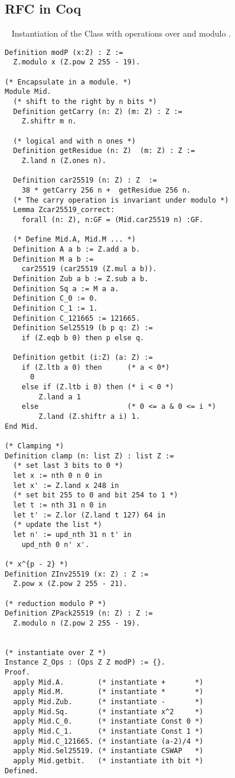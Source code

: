 \subsection{RFC in Coq}
\label{subsubsec:RFC-Coq}
~
Instantiation of the Class  with operations over \Z and modulo \p.
\begin{lstlisting}[language=Coq]
Definition modP (x:Z) : Z :=
  Z.modulo x (Z.pow 2 255 - 19).

(* Encapsulate in a module. *)
Module Mid.
  (* shift to the right by n bits *)
  Definition getCarry (n: Z) (m: Z) : Z :=
    Z.shiftr m n.

  (* logical and with n ones *)
  Definition getResidue (n: Z)  (m: Z) : Z :=
    Z.land n (Z.ones n).

  Definition car25519 (n: Z) : Z  :=
    38 * getCarry 256 n +  getResidue 256 n.
  (* The carry operation is invariant under modulo *)
  Lemma Zcar25519_correct:
    forall (n: Z), n:GF = (Mid.car25519 n) :GF.

  (* Define Mid.A, Mid.M ... *)
  Definition A a b := Z.add a b.
  Definition M a b :=
    car25519 (car25519 (Z.mul a b)).
  Definition Zub a b := Z.sub a b.
  Definition Sq a := M a a.
  Definition C_0 := 0.
  Definition C_1 := 1.
  Definition C_121665 := 121665.
  Definition Sel25519 (b p q: Z) :=
    if (Z.eqb b 0) then p else q.

  Definition getbit (i:Z) (a: Z) :=
    if (Z.ltb a 0) then      (* a < 0*)
      0
    else if (Z.ltb i 0) then (* i < 0 *)
        Z.land a 1
    else                     (* 0 <= a & 0 <= i *)
        Z.land (Z.shiftr a i) 1.
End Mid.

(* Clamping *)
Definition clamp (n: list Z) : list Z :=
  (* set last 3 bits to 0 *)
  let x := nth 0 n 0 in
  let x' := Z.land x 248 in
  (* set bit 255 to 0 and bit 254 to 1 *)
  let t := nth 31 n 0 in
  let t' := Z.lor (Z.land t 127) 64 in
  (* update the list *)
  let n' := upd_nth 31 n t' in
    upd_nth 0 n' x'.

(* x^{p - 2} *)
Definition ZInv25519 (x: Z) : Z :=
  Z.pow x (Z.pow 2 255 - 21).

(* reduction modulo P *)
Definition ZPack25519 (n: Z) : Z :=
  Z.modulo n (Z.pow 2 255 - 19).


(* instantiate over Z *)
Instance Z_Ops : (Ops Z Z modP) := {}.
Proof.
  apply Mid.A.        (* instantiate +       *)
  apply Mid.M.        (* instantiate *       *)
  apply Mid.Zub.      (* instantiate -       *)
  apply Mid.Sq.       (* instantiate x^2     *)
  apply Mid.C_0.      (* instantiate Const 0 *)
  apply Mid.C_1.      (* instantiate Const 1 *)
  apply Mid.C_121665. (* instantiate (a-2)/4 *)
  apply Mid.Sel25519. (* instantiate CSWAP   *)
  apply Mid.getbit.   (* instantiate ith bit *)
Defined.


\end{lstlisting}
